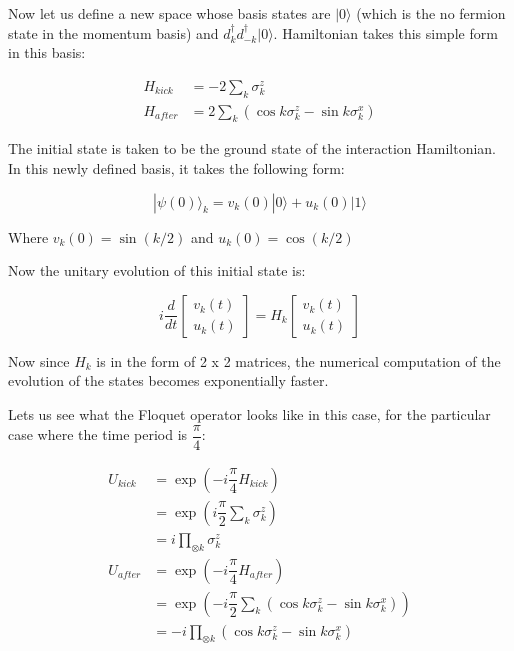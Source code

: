 \documentclass[11pt,a4paper]{article}
\begin{document}
	Now let us define a new space whose basis states are $ |0\rangle $ (which is the no fermion state in the momentum basis) and $ d_{k}^\dagger d_{-k}^\dagger |0\rangle $. Hamiltonian takes this simple form in this basis:
			
			\begin{align}
			H_{kick} &= -2 \sum_{k}  \sigma_{k}^z\\
			H_{after} &= 2\sum_{k} (\cos k \sigma_{k}^z - \sin k \sigma_{k}^x )
			\end{align}	
			
			
	The initial state is taken to be the ground state of the interaction Hamiltonian. In this newly defined basis, it takes the following form:
		
		\begin{equation}\label{key}
		 |\psi(0)\rangle_{k} = v_{k}(0) |0\rangle + u_{k}(0) |1\rangle
		\end{equation}
		
		Where $ v_{k}(0) = \sin(k/2) $ and $ u_{k}(0) = \cos(k/2) $
		
		Now the unitary evolution of this initial state is: 
		
		\begin{equation}\label{key}
		i \dfrac{d}{dt} \begin{bmatrix}
		v_{k}(t)\\u_{k}(t)
		\end{bmatrix} =  H_{k}\begin{bmatrix}
			v_{k}(t)\\u_{k}(t)
		\end{bmatrix}
		\end{equation}
		
		Now since $ H_{k} $ is in the form of  2 x 2  matrices, the numerical computation of the evolution of the states becomes exponentially faster. 
 		
 		Lets us see what the Floquet operator looks like in this case, for the particular case where the time period is $ \dfrac{\pi}{4} $: 
 		
 			\begin{align}
 		U_{kick}& = \exp(-i \dfrac{\pi}{4} H_{kick})\\
 		& = \exp(i \dfrac{\pi}{2} \sum_{k}\sigma_{k}^z)\\
 		& = i\prod_{\otimes k} \sigma_{k}^z\\
 		U_{after} & = \exp(-i\dfrac{\pi}{4}H_{after})\\
 		&= \exp(-i\dfrac{\pi}{2}\sum_{k} (\cos k \sigma_{k}^z - \sin k \sigma_{k}^x ))\\
 		& = -i \prod_{\otimes k} (\cos k \sigma_{k}^z - \sin k \sigma_{k}^x )
 		\end{align}
 		
\end{document}
